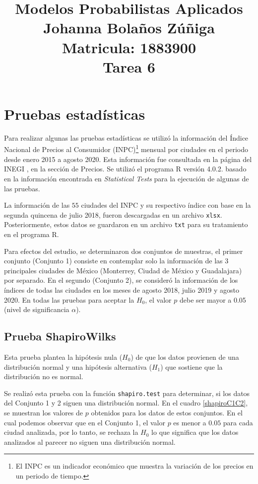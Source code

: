 \documentclass{article}
\title{
\centering
Modelos Probabilistas Aplicados \\
Johanna Bolaños Zúñiga \\
Matricula: 1883900\\
Tarea 6
}
\date{}
\begin{document}
\maketitle

\section{Pruebas estadísticas}

Para realizar algunas las pruebas estadísticas se utilizó la información del Índice Nacional de Precios al Consumidor (INPC)\footnote{El INPC es un indicador económico que muestra la variación de los precios en un periodo de tiempo.} mensual por ciudades en el periodo desde enero 2015 a agosto 2020. Esta información fue consultada en la página del INEGI \cite{INEGI}, en la sección de Precios. Se utilizó el programa R versión 4.0.2. \cite{r} basado en la información encontrada en \textit{Statistical Tests} \cite{test} para la ejecución de algunas de las pruebas.

La información de las $55$ ciudades del INPC y su respectivo índice con base en la segunda quincena de julio 2018, fueron descargadas en un archivo \texttt{xlsx}. Posteriormente, estos datos se guardaron en un archivo \texttt{txt} para su tratamiento en el programa R.

Para efectos del estudio, se determinaron dos conjuntos de muestras, el primer conjunto (Conjunto 1) consiste en contemplar solo la información de las $3$ principales ciudades de México (Monterrey, Ciudad de México y Guadalajara) por separado. En el segundo (Conjunto 2), se consideró la información de los índices de todas las ciudades en los meses de agosto 2018, julio 2019 y agosto 2020. En todas las pruebas para aceptar la $H_{0}$, el valor $p$ debe ser mayor a 0.05 (nivel de significancia $\alpha$).

\subsection{Prueba Shapiro\textendash Wilks}
Esta prueba plantea la hipótesis nula ($H_{0}$) de que los datos provienen de una distribución normal y una hipótesis alternativa ($H_{1}$) que sostiene que la distribución no es normal.

Se realizó esta prueba con la función \texttt{shapiro.test} para determinar, si los datos del Conjunto 1 y 2 siguen una distribución normal. En el cuadro \ref{shapiroC1C2}, se muestran los valores de $p$ obtenidos para los datos de estos conjuntos. En el cual podemos observar que en el Conjunto 1, el valor $p$ es menor a $0.05$ para cada ciudad analizada, por lo tanto, se rechaza la $H_{0}$ lo que significa que los datos analizados al parecer no siguen una distribución normal. 
\end{document}
